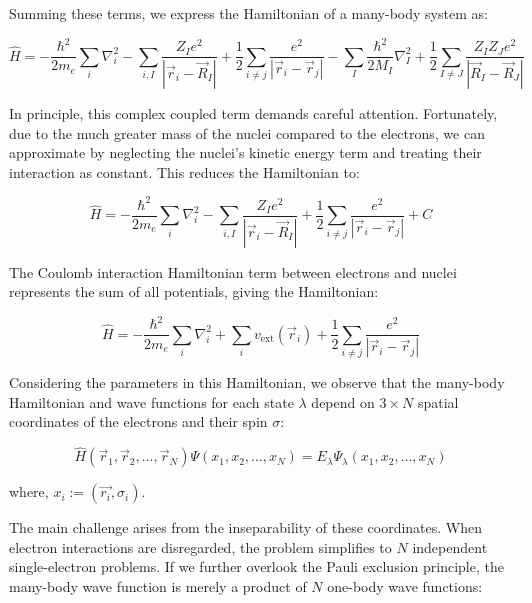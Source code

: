 Summing these terms, we express the Hamiltonian of a many-body system as:

\begin{equation}
    \hat{H}=-\frac{\hbar^2}{2m_e}\sum_i\nabla_i^2
    -\sum_{i,I}\frac{Z_I e^2}{|\Vec{r}_i-\Vec{R}_I|}
    +\frac{1}{2}\sum_{i\neq j}\frac{e^2}{|\Vec{r}_i-\Vec{r}_j|}
    -\sum_I\frac{\hbar^2}{2M_I}\nabla_I^2
    +\frac{1}{2}\sum_{I\neq J}\frac{Z_I Z_J e^2}{|\Vec{R}_I-\Vec{R}_J|}
    \label{full_many_body_hamiltonian}
\end{equation}

In principle, this complex coupled term demands careful attention. Fortunately, due to the much greater mass of the nuclei compared to the electrons, we can approximate by neglecting the nuclei’s kinetic energy term and treating their interaction as constant. This reduces the Hamiltonian to:

\begin{equation}
    \hat{H}=-\frac{\hbar^2}{2m_e}\sum_i\nabla_i^2
    -\sum_{i,I}\frac{Z_I e^2}{|\Vec{r}_i-\Vec{R}_I|}
    +\frac{1}{2}\sum_{i\neq j}\frac{e^2}{|\Vec{r}_i-\Vec{r}_j|}
    +C
    \label{many_body_hamiltonian}
\end{equation}

The Coulomb interaction Hamiltonian term between electrons and nuclei represents the sum of all potentials, giving the Hamiltonian:

\begin{equation}
    \hat{H}=-\frac{\hbar^2}{2m_e}\sum_i\nabla_i^2
    +\sum_i v_\text{ext}(\Vec{r}_i)
    +\frac{1}{2}\sum_{i\neq j}\frac{e^2}{|\Vec{r}_i-\Vec{r}_j|}
    \label{many_body_hamiltonian}
\end{equation}

Considering the parameters in this Hamiltonian, we observe that the many-body Hamiltonian and wave functions for each state $\lambda$ depend on $3 \times N$ spatial coordinates of the electrons and their spin $\sigma$:

\begin{equation}
    \hat{H}(\Vec{r}_1,\Vec{r}_2,\dots,\Vec{r}_N)\Psi(x_1,x_2,\dots,x_N)
    = E_\lambda\Psi_\lambda(x_1,x_2,\dots,x_N)
    \label{many_body_hamiltonian_argument}
\end{equation}

where, $x_i:=(\Vec{r_i},\sigma_i)$.

The main challenge arises from the inseparability of these coordinates. When electron interactions are disregarded, the problem simplifies to 
$N$ independent single-electron problems. If we further overlook the Pauli exclusion principle, the many-body wave function is merely a product of 
$N$ one-body wave functions:

